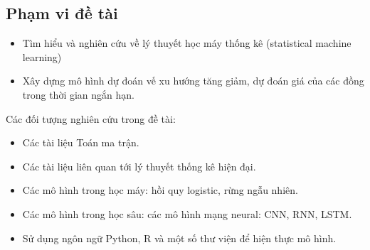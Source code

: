 \subsection{Phạm vi đề tài}
\begin{itemize}
\item Tìm hiểu và nghiên cứu về lý thuyết học máy thống kê (statistical machine learning)
\item Xây dựng mô hình dự đoán vế xu hướng tăng giảm, dự đoán giá của các đồng trong thời gian ngắn hạn.
\end{itemize}
Các đối tượng nghiên cứu trong đề tài:
\begin{itemize}
\item Các tài liệu Toán ma trận.
\item Các tài liệu liên quan tới lý thuyết thống kê hiện đại.
\item Các mô hình trong học máy: hồi quy logistic, rừng ngẫu nhiên.
\item Các mô hình trong học sâu: các mô hình mạng neural: CNN, RNN, LSTM.
\item Sử dụng ngôn ngữ Python, R và một số thư viện để hiện thực mô hình.
\end{itemize}



